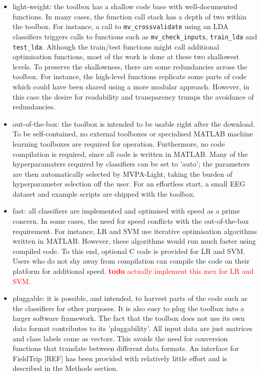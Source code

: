 \documentclass[utf8]{frontiersSCNS} %
\newcommand{\mvpa}{MVPA-Light}
\newcommand{\todo}[1]{\textcolor{red}{\textbf{todo} #1}}
\begin{document}
\begin{itemize}
\item light-weight: the toolbox has a shallow code base with well-documented functions. In many cases, the function call stack has a depth of two within the toolbox. For instance, a call to \texttt{mv\_crossvalidate} using an LDA classifiers triggers calls to functions such as  \texttt{mv\_check\_inputs}, \texttt{train\_lda} and \texttt{test\_lda}. Although the train/test functions might call additional optimisation functions, most of the work is done at these two shallowest levels. To preserve the shallowness, there are some redundancies across the toolbox. For instance, the high-level functions replicate some parts of code which could have been shared using a more modular approach. However, in this case the desire for readability and transparency trumps the avoidance of redundancies.
\item out-of-the-box: the toolbox is intended to be usable right after the download. To be self-contained, no external toolboxes or specialised MATLAB machine learning toolboxes are required for operation. Furthermore, no code compilation is required, since all code is written in MATLAB. Many of the hyperparamaters required by classifiers can be set to 'auto'; the parameters are then automatically selected by \mvpa{}, taking the burden of hyperparameter selection off the user. For an effortless start, a small EEG dataset and example scripts are shipped with the toolbox.
\item fast: all classifiers are implemented and optimised with speed as a prime concern. In some cases, the need for speed conflicts with the out-of-the-box requirement. For instance, LR and SVM use iterative optimisation algorithms written in MATLAB. However, these algorithms would run much faster using compiled code. To this end, optional C code is provided for LR and SVM. Users who do not shy away from compilation can compile the code on their platform for additional speed.  \todo{actually implement this mex for LR and SVM}.
\item pluggable: it is possible, and intended, to harvest parts of the code such as the classifiers for other purposes. It is also easy to plug the toolbox into a larger software framework. The fact that the toolbox does not use its own data format contributes to its 'pluggability'. All input data are just matrices and class labels come as vectors. This avoids the need for conversion functions that translate between different data formats. An interface for FieldTrip [REF] has been provided with relatively little effort and is described in the Methods section.
\end{itemize}
\end{document}
